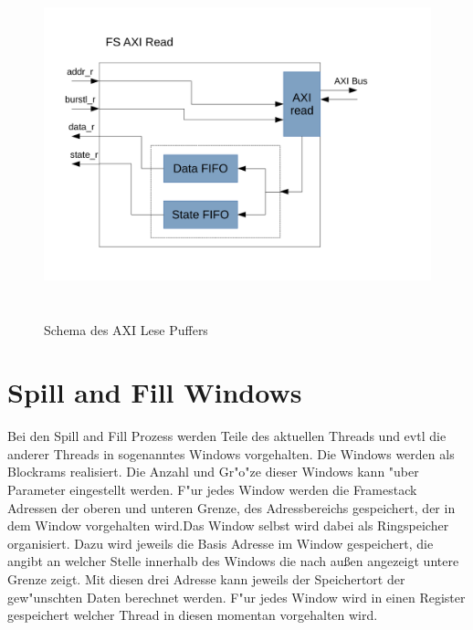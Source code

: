 \begin{figure}
	\centering
	\includegraphics[height = 10cm]{PS_RS_graphics/AxiReadBuffer.pdf}
	\caption{Schema des AXI Lese Puffers}
\end{figure}

\section{Spill and Fill Windows}

Bei den Spill and Fill Prozess werden Teile des aktuellen Threads  und evtl die anderer Threads in sogenanntes Windows vorgehalten. Die Windows werden als Blockrams realisiert. 
Die Anzahl und Gr"o"ze dieser Windows kann "uber Parameter eingestellt werden. F"ur jedes Window werden die Framestack Adressen der oberen und unteren Grenze, des Adressbereichs gespeichert, der in dem Window vorgehalten wird.Das Window selbst wird dabei als Ringspeicher organisiert. Dazu wird jeweils die Basis Adresse im Window gespeichert, die angibt an welcher Stelle innerhalb des Windows die nach außen angezeigt untere Grenze zeigt. Mit diesen drei Adresse kann jeweils der Speichertort der gew"unschten Daten berechnet werden. 
F"ur jedes Window wird in einen Register gespeichert welcher Thread in diesen momentan vorgehalten wird. 

